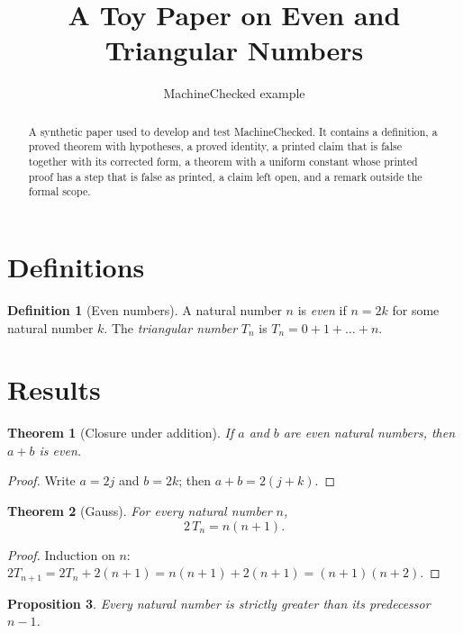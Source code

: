 \documentclass[11pt]{article}
\title{A Toy Paper on Even and Triangular Numbers}
\author{MachineChecked example}
\date{}
\newtheorem{theorem}{Theorem}[section]
\newtheorem{proposition}[theorem]{Proposition}
\theoremstyle{definition}
\newtheorem{definition}{Definition}[section]
\theoremstyle{remark}
\begin{document}
\maketitle

\begin{abstract}
A synthetic paper used to develop and test MachineChecked. It contains a definition, a proved
theorem with hypotheses, a proved identity, a printed claim that is false together with its
corrected form, a theorem with a uniform constant whose printed proof has a step that is false
as printed, a claim left open, and a remark outside the formal scope.
\end{abstract}

\section{Definitions}

\begin{definition}[Even numbers]\label{def:even}
A natural number $n$ is \emph{even} if $n = 2k$ for some natural number $k$. The
\emph{triangular number} $T_n$ is $T_n = 0 + 1 + \dots + n$.
\end{definition}

\section{Results}

\begin{theorem}[Closure under addition]\label{thm:even-add}
If $a$ and $b$ are even natural numbers, then $a + b$ is even.
\end{theorem}

\begin{proof}
Write $a = 2j$ and $b = 2k$; then $a + b = 2(j + k)$.
\end{proof}

\begin{theorem}[Gauss]\label{thm:triangle}
For every natural number $n$,
\begin{equation}\label{eq:gauss}
  2\,T_n = n(n+1).
\end{equation}
\end{theorem}

\begin{proof}
Induction on $n$: $2T_{n+1} = 2T_n + 2(n+1) = n(n+1) + 2(n+1) = (n+1)(n+2)$.
\end{proof}

\begin{proposition}\label{prop:pred}
Every natural number is strictly greater than its predecessor $n - 1$.
\end{proposition}
\end{document}
